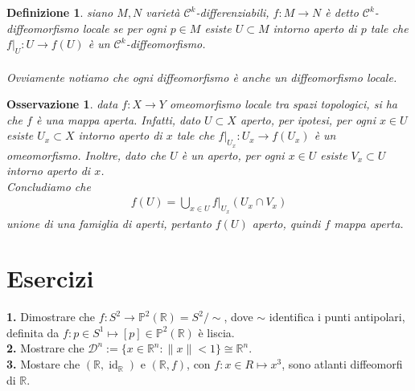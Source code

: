 \documentclass[oneside, 11pt]{amsbook}
\newcommand{\C}{\mathcal{C}}
\newcommand{\D}{\mathcal{D}}
\newcommand{\R}{\mathbb{R}}
\newcommand{\co}[1]{\textit{#1}}
\newcommand{\gr}[1]{\textbf{#1}}
\newcommand{\id}{\operatorname{id}}
\newcommand{\0}{{(0)}}
\newcommand{\3}{{(3)}}
\theoremstyle{colonplain}
\theoremstyle{colondefinition}
\newtheorem{defn}[thm]{Definizione}
\theoremstyle{colonremark}
\newtheorem{rmk}[thm]{Osservazione}
\numberwithin{equation}{chapter}
\begin{document}
\begin{defn}
    siano $M, N$ varietà $\C^k$-differenziabili, $f : M \longrightarrow N$ è detto $\C^k$-\co{diffeomorfismo locale} se per ogni $p \in M$ esiste $U \subset M$ intorno aperto di $p$ tale che $f|_U : U \longrightarrow f(U)$ è un $\C^k$-diffeomorfismo. \\ \\
    Ovviamente notiamo che ogni diffeomorfismo è anche un diffeomorfismo locale.
\end{defn}
\begin{rmk}
    data $f : X \longrightarrow Y$ omeomorfismo locale tra spazi topologici, si ha che $f$ è una mappa aperta. Infatti, dato $U \subset X$ aperto, per ipotesi, per ogni $x \in U$ esiste $U_x \subset X$ intorno aperto di $x$ tale che $f|_{U_x} : U_x \longrightarrow f(U_x)$ è un omeomorfismo. Inoltre, dato che $U$ è un aperto, per ogni $x \in U$ esiste $V_x \subset U$ intorno aperto di $x$. \\
    Concludiamo che
    \begin{align}
        f(U) = \bigcup_{x \in U} f|_{U_x}(U_x \cap V_x)
    \end{align}
    unione di una famiglia di aperti, pertanto $f(U)$ aperto, quindi $f$ mappa aperta.
\end{rmk}


\section{Esercizi}
\gr{1.} Dimostrare che $f : S^2 \longrightarrow \mathbb{P}^2(\R) = S^2 / \sim$, dove $\sim$ identifica i punti antipolari, definita da $f : p \in S^1 \mapsto [p] \in \mathbb{P}^2(\R)$ è liscia. \\

\gr{2.} Mostrare che $\D^n := \{x \in \R^n : \|x\| < 1\} \cong \R^n$. \\

\gr{3.} Mostare che $(\R, \id_\R)$ e $(\R, f)$, con $f : x \in R \mapsto x^3$, sono atlanti diffeomorfi di $\R$.
\end{document}
